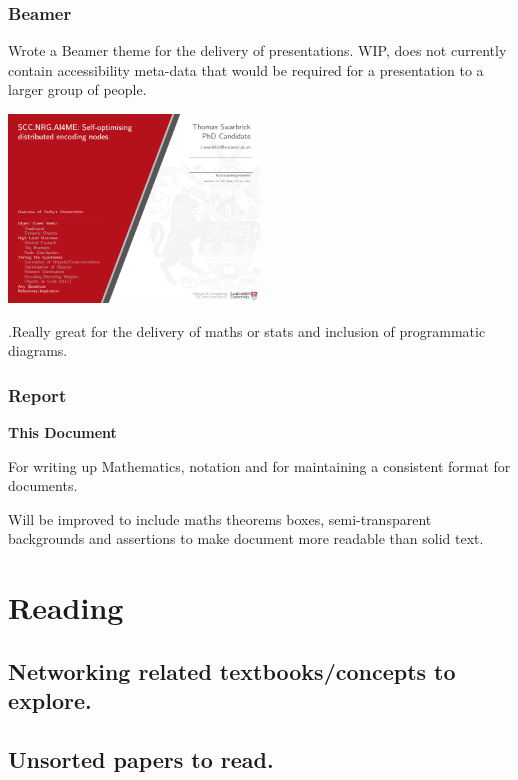 \documentclass[]{scrreprt}
\begin{document}
\subsection{Beamer}
Wrote a Beamer theme for the delivery of presentations. WIP, does not currently contain accessibility meta-data that would be required for a presentation to a larger group of people.
\begin{center}
  \includegraphics[width=0.5\textwidth]{example.pdf}
\end{center}

.Really great for the delivery of maths or stats and inclusion of programmatic diagrams.

\subsection{Report}
\textbf{This Document}

For writing up Mathematics, notation and for maintaining a consistent format for documents.

Will be improved to include maths theorems boxes, semi-transparent backgrounds and assertions to make document more readable than solid text.

\chapter{Reading}
\section{Networking related textbooks/concepts to explore.}
\section{Unsorted papers to read.}
\end{document}
